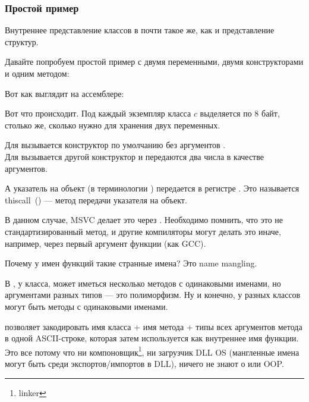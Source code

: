 \subsubsection{Простой пример}

Внутреннее представление классов в \Cpp почти такое же, как и представление структур.

Давайте попробуем простой пример с двумя переменными, двумя конструкторами и одним методом:




Вот как выглядит \main на ассемблере:



Вот что происходит. 
Под каждый экземпляр класса $c$ выделяется по 8 байт, столько же, сколько нужно 
для хранения двух переменных.

Для  вызывается конструктор по умолчанию без аргументов . \\
Для  вызывается другой конструктор  и передаются два числа в качестве аргументов.

\label{thiscall}
А указатель на объект (\ITthis в терминологии \Cpp) передается в регистре \ECX. 
Это называется thiscall~() --- метод передачи указателя на объект.

В данном случае, MSVC делает это через \ECX. Необходимо помнить, что это не стандартизированный метод, 
и другие компиляторы могут делать это иначе, например, через первый аргумент функции (как GCC).

\label{namemangling}
Почему у имен функций такие странные имена? Это \gls{name mangling}.

В \Cpp, у класса, может иметься несколько методов с одинаковыми именами, 
но аргументами разных типов --- это полиморфизм. 
Ну и конечно, у разных классов могут быть методы с одинаковыми именами.

 позволяет закодировать имя класса + имя метода + типы всех аргументов метода 
в одной ASCII-строке, которая затем используется как внутреннее имя функции. 
Это все потому что ни компоновщик\footnote{linker}, ни загрузчик DLL \ac{OS}
(мангленные имена могут быть среди экспортов/импортов в DLL), 
ничего не знают о \Cpp или \ac{OOP}.

